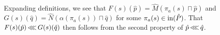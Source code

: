 Expanding definitions, we see that $F(s)(\hat p) = \hat M(\pi_{a}(s) \sqcap \hat p)$ and $G(s)(\hat q) = \hat N(\alpha(\pi_{a}(s)) \sqcap \hat q)$ for some $\pi_{a}(s) \in \operatorname{in}(\hat P)$. That $F(s)(\hat p) \operatorname{\lll} G(s)(\hat q)$ then follows from the second property of $\hat p \operatorname{\lll} \hat q$.






